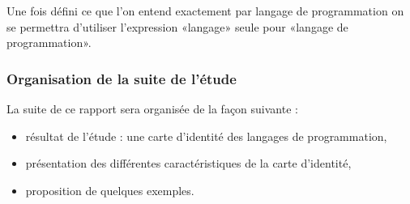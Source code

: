 Une fois défini ce que l’on entend exactement par langage de programmation on se permettra d’utiliser l’expression «langage» seule pour «langage de programmation».

\subsubsection{Organisation de la suite de l'étude}

La suite de ce rapport sera organisée de la façon suivante :
\begin{itemize}
\item résultat de l'étude : une carte d'identité des langages de programmation,
\item présentation des différentes caractéristiques de la carte d'identité,
\item proposition de quelques exemples.\\
\end{itemize}

